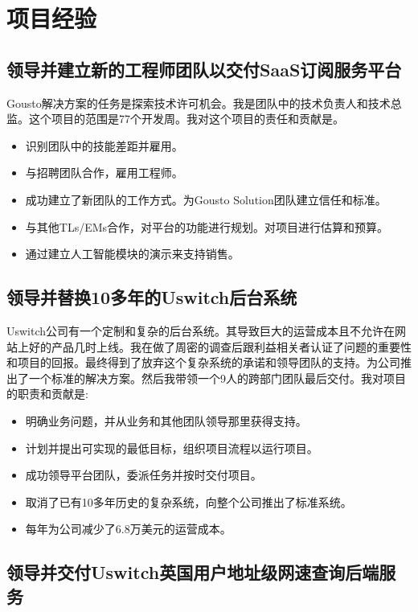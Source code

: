 \documentclass[a4paper]{twentysecondcv-chinese} %
\begin{document}
\section{项目经验}

\subsection{领导并建立新的工程师团队以交付SaaS订阅服务平台}

Gousto解决方案的任务是探索技术许可机会。我是团队中的技术负责人和技术总监。这个项目的范围是77个开发周。我对这个项目的责任和贡献是。
\begin{itemize}
  \item 识别团队中的技能差距并雇用。
  \item 与招聘团队合作，雇用工程师。
  \item 成功建立了新团队的工作方式。为Gousto Solution团队建立信任和标准。
  \item 与其他TLs/EMs合作，对平台的功能进行规划。对项目进行估算和预算。
  \item 通过建立人工智能模块的演示来支持销售。
\end{itemize}

\subsection{领导并替换10多年的Uswitch后台系统}

Uswitch公司有一个定制和复杂的后台系统。其导致巨大的运营成本且不允许在网站上好的产品几时上线。我在做了周密的调查后跟利益相关者认证了问题的重要性和项目的回报。最终得到了放弃这个复杂系统的承诺和领导团队的支持。为公司推出了一个标准的解决方案。然后我带领一个9人的跨部门团队最后交付。我对项目的职责和贡献是:
\begin{itemize}
  \item 明确业务问题，并从业务和其他团队领导那里获得支持。
  \item 计划并提出可实现的最低目标，组织项目流程以运行项目。
  \item 成功领导平台团队，委派任务并按时交付项目。
  \item 取消了已有10多年历史的复杂系统，向整个公司推出了标准系统。
  \item 每年为公司减少了6.8万美元的运营成本。
\end{itemize}

\subsection{领导并交付Uswitch英国用户地址级网速查询后端服务}
\end{document}
